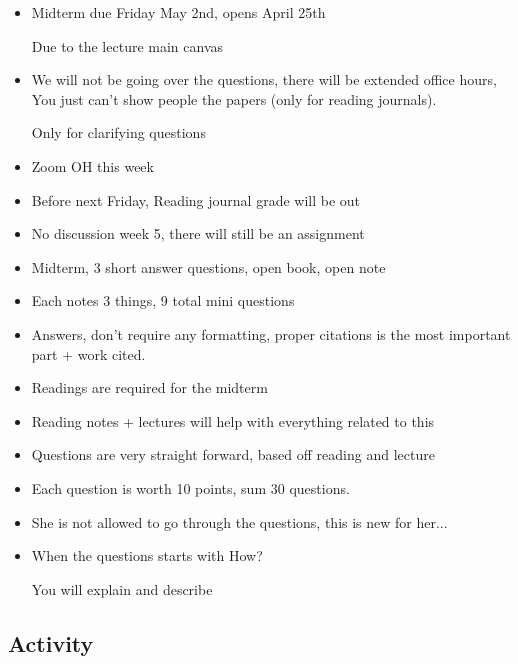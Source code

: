 \documentclass{article}
\begin{document}
\begin{itemize}
  \item Midterm due Friday May 2nd, opens April 25th

    Due to the lecture main canvas
  \item We will not be going over the questions, there will be extended office hours,
    You just can't show people the papers (only for reading journals).

    Only for clarifying questions
  \item Zoom OH this week
  \item Before next Friday, Reading journal grade will be out
  \item No discussion week 5, there will still be an assignment
  \item Midterm, 3 short answer questions, open book, open note
  \item Each notes 3 things, 9 total mini questions
  \item Answers, don't require any formatting, proper citations is the
    most important part + work cited.
  \item Readings are required for the midterm
  \item Reading notes + lectures will help with everything related to this
  \item Questions are very straight forward, based off reading and lecture
  \item Each question is worth 10 points, sum 30 questions.
  \item She is not allowed to go through the questions, this is new for her...
  \item When the questions starts with How?

    You will explain and describe
  \end{itemize}

  \subsection{Activity}
\end{document}
